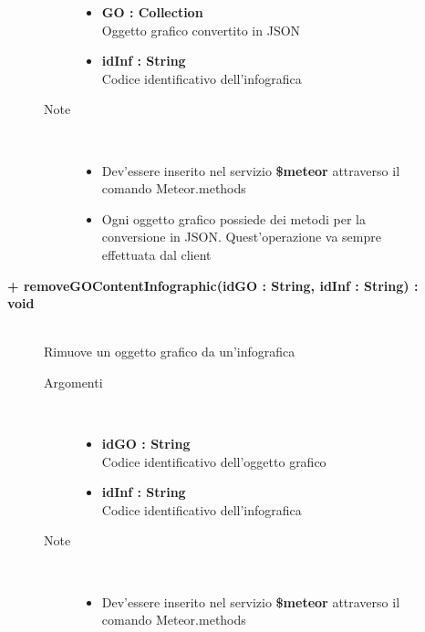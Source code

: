 \begin{description}
\begin{description}
\begin{description}
\begin{itemize}
					\item \textbf{GO : Collection			} \hfill \\
					Oggetto grafico convertito in JSON
					\item \textbf{idInf :  String			} \hfill \\
					Codice identificativo dell'infografica
					
				\end{itemize}
			\item[Note] \hfill \\
			\begin{itemize}
					\item Dev'essere inserito nel servizio \textbf{\$meteor} attraverso il comando Meteor.methods
					\item Ogni oggetto grafico possiede dei metodi per la conversione in JSON. Quest'operazione va sempre effettuata dal client
				\end{itemize}
		\end{description}
	\end{description}
	
	\begin{description}
		\item[\textbf{\color{blue}+ removeGOContentInfographic(idGO : String, idInf : String) : void			}] \hfill \\
			Rimuove un oggetto grafico da un'infografica
			
		\begin{description}
			\item[Argomenti] \hfill \\
				\begin{itemize}
				
					\item \textbf{idGO : String			} \hfill \\
					Codice identificativo dell'oggetto grafico
					\item \textbf{idInf : String			} \hfill \\
					Codice identificativo dell'infografica
					
				\end{itemize}
			\item[Note] \hfill \\
			\begin{itemize}
					\item Dev'essere inserito nel servizio \textbf{\$meteor} attraverso il comando Meteor.methods
				\end{itemize}
		\end{description}
	\end{description}
	

\end{description}
